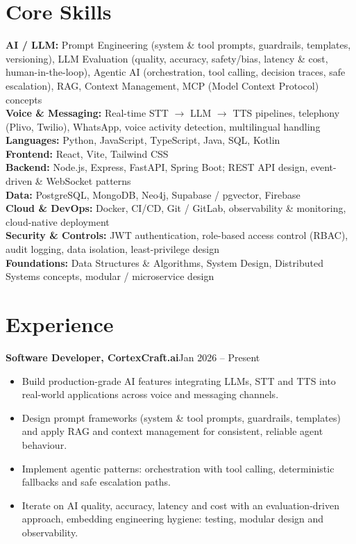 \documentclass[10pt,a4paper]{article}
\newcommand{\entry}[2]{\textbf{#1}\hfill{#2}\par}
\begin{document}
\section{Core Skills}
\textbf{AI / LLM:} Prompt Engineering (system \& tool prompts, guardrails, templates, versioning), LLM
Evaluation (quality, accuracy, safety/bias, latency \& cost, human-in-the-loop), Agentic AI
(orchestration, tool calling, decision traces, safe escalation), RAG, Context Management, MCP (Model
Context Protocol) concepts\\
\textbf{Voice \& Messaging:} Real-time STT $\rightarrow$ LLM $\rightarrow$ TTS pipelines, telephony
(Plivo, Twilio), WhatsApp, voice activity detection, multilingual handling\\
\textbf{Languages:} Python, JavaScript, TypeScript, Java, SQL, Kotlin\\
\textbf{Frontend:} React, Vite, Tailwind CSS\\
\textbf{Backend:} Node.js, Express, FastAPI, Spring Boot; REST API design, event-driven \& WebSocket patterns\\
\textbf{Data:} PostgreSQL, MongoDB, Neo4j, Supabase / pgvector, Firebase\\
\textbf{Cloud \& DevOps:} Docker, CI/CD, Git / GitLab, observability \& monitoring, cloud-native deployment\\
\textbf{Security \& Controls:} JWT authentication, role-based access control (RBAC), audit logging, data
isolation, least-privilege design\\
\textbf{Foundations:} Data Structures \& Algorithms, System Design, Distributed Systems concepts,
modular / microservice design

\section{Experience}

\entry{Software Developer, CortexCraft.ai}{Jan 2026 -- Present}
\begin{itemize}
  \item Build production-grade AI features integrating LLMs, STT and TTS into real-world applications across voice and messaging channels.
  \item Design prompt frameworks (system \& tool prompts, guardrails, templates) and apply RAG and context management for consistent, reliable agent behaviour.
  \item Implement agentic patterns: orchestration with tool calling, deterministic fallbacks and safe escalation paths.
  \item Iterate on AI quality, accuracy, latency and cost with an evaluation-driven approach, embedding engineering hygiene: testing, modular design and observability.
\end{itemize}
\end{document}
